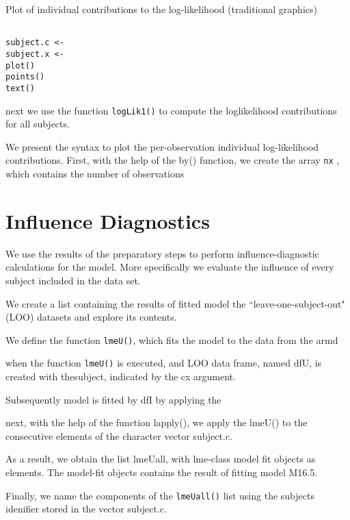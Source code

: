 \documentclass[a4paper,12pt]{article}
\begin{document}
Plot of individual contributions to the log-likelihood (traditional graphics)
\begin{framed}
\begin{verbatim}

subject.c <-
subject.x <- 
plot()
points()
text()
\end{verbatim}
\end{framed}

next we use the function \texttt{logLik1()} to compute the loglikelihood
contributions for all subjects.

We present the syntax to plot the per-observation individual log-likelihood contributions.
First, with the help of the by() function, we create the array \texttt{nx} , which contains the number
of observations


\section{Influence Diagnostics}

We use the results of the preparatory steps to perform influence-diagnostic calculations for the model.
More specifically we evaluate the influence of every subject included in the data set.


We create a list containing the results of fitted model the ``leave-one-subject-out" (LOO)
datasets and explore its contents.

We define the function \texttt{lmeU()}, which fits the model to the data from the armd

when the function \texttt{lmeU()} is executed, and LOO data frame, named dfU, is created with thesubject, indicated by the cx argument.

Subsequently model is fitted by dfI by applying the 


next, with the help of the function lapply(), we apply the lmeU() to the consecutive elements of the character vector subject.c.

As a result, we obtain the list lmeUall, with lme-class model fit objects as elements. The model-fit objects contains the result of fitting model
M16.5.

Finally, we name the components of the \texttt{lmeUall()} list using the subjects idenifier stored in the vector subject.c.
\end{document}
